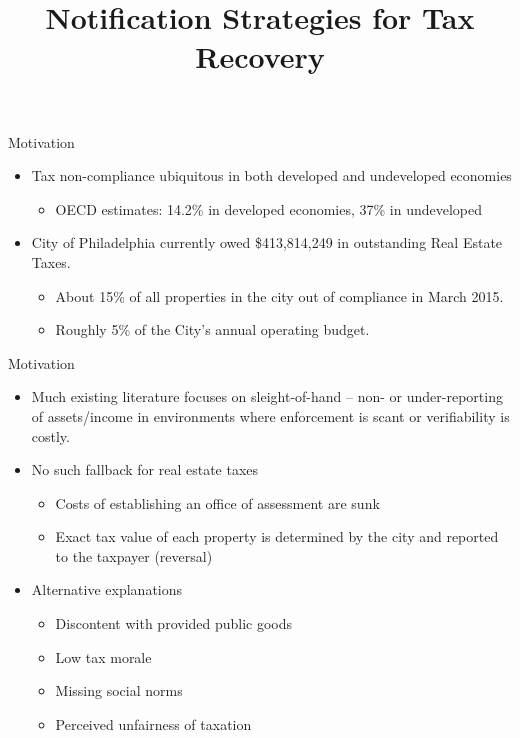 \documentclass[ignorenonframetext,]{beamer}
\title{Notification Strategies for Tax Recovery}
\author{Michael Chirico\footnote<.->{The research presented here was supported
  in part by the Institute of Education Sciences, U.S. Department of
  Education, through Grant \#R305B090015 to the University of
  Pennsylvania. The opinions expressed are those of the presenter and do
  not represent the views of the Institute or the U.S. Department of
  Education.}, Robert Inman, Charles Loeffler, John MacDonald, Holger
Sieg}
\date{March 1, 2016

\tiny{This Version: March 20, 2016 at 14:40}}
\providecommand{\tightlist}{%
  \setlength{\itemsep}{0pt}\setlength{\parskip}{0pt}}
\begin{document}
\frame{\titlepage}

\begin{frame}{Motivation}

\begin{itemize}
\item
  Tax non-compliance ubiquitous in both developed and undeveloped
  economies

  \begin{itemize}
  \tightlist
  \item
    OECD estimates: 14.2\% in developed economies, 37\% in undeveloped
  \end{itemize}
\item
  City of Philadelphia currently owed \$413,814,249 in outstanding Real
  Estate Taxes.

  \begin{itemize}
  \item
    About 15\% of all properties in the city out of compliance in March
    2015.
  \item
    Roughly 5\% of the City's annual operating budget.
  \end{itemize}
\end{itemize}

\end{frame}

\begin{frame}{Motivation}

\begin{itemize}
\item
  Much existing literature focuses on sleight-of-hand -- non- or
  under-reporting of assets/income in environments where enforcement is
  scant or verifiability is costly.
\item
  No such fallback for real estate taxes

  \begin{itemize}
  \item
    Costs of establishing an office of assessment are sunk
  \item
    Exact tax value of each property is determined by the city and
    reported to the taxpayer (reversal)
  \end{itemize}
\item
  Alternative explanations

  \begin{itemize}
  \item
    Discontent with provided public goods
  \item
    Low tax morale
  \item
    Missing social norms
  \item
    Perceived unfairness of taxation
  \end{itemize}
\end{itemize}

\end{frame}
\end{document}
